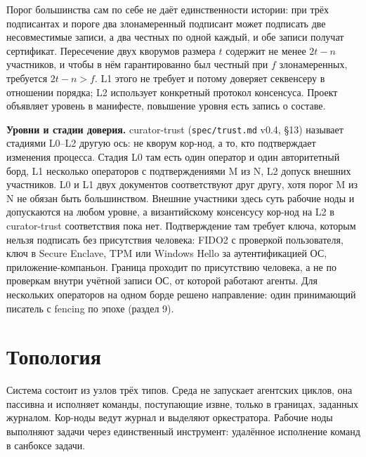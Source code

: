 \documentclass[11pt,a4paper]{article}
\begin{document}
Порог большинства сам по себе не даёт единственности истории: при трёх подписантах и пороге два злонамеренный подписант может подписать две несовместимые записи, а два честных по одной каждый, и обе записи получат сертификат. Пересечение двух кворумов размера $t$ содержит не менее $2t - n$ участников, и чтобы в нём гарантированно был честный при $f$ злонамеренных, требуется $2t - n > f$. L1 этого не требует и потому доверяет секвенсеру в отношении порядка; L2 использует конкретный протокол консенсуса. Проект объявляет уровень в манифесте, повышение уровня есть запись о составе.

\textbf{Уровни и стадии доверия.} curator-trust (\texttt{spec/trust.md} v0.4, §13) называет стадиями L0--L2 другую ось: не кворум кор-нод, а то, кто подтверждает изменения процесса. Стадия L0 там есть один оператор и один авторитетный борд, L1 несколько операторов с подтверждениями M из N, L2 допуск внешних участников. L0 и L1 двух документов соответствуют друг другу, хотя порог M из N не обязан быть большинством. Внешние участники здесь суть рабочие ноды и допускаются на любом уровне, а византийскому консенсусу кор-нод на L2 в curator-trust соответствия пока нет. Подтверждение там требует ключа, которым нельзя подписать без присутствия человека: FIDO2 с проверкой пользователя, ключ в Secure Enclave, TPM или Windows Hello за аутентификацией ОС, приложение-компаньон. Граница проходит по присутствию человека, а не по проверкам внутри учётной записи ОС, от которой работают агенты. Для нескольких операторов на одном борде решено направление: один принимающий писатель с fencing по эпохе (раздел 9).

\section{Топология}

Система состоит из узлов трёх типов. Среда не запускает агентских циклов, она пассивна и исполняет команды, поступающие извне, только в границах, заданных журналом. Кор-ноды ведут журнал и выделяют оркестратора. Рабочие ноды выполняют задачи через единственный инструмент: удалённое исполнение команд в санбоксе задачи.
\end{document}
